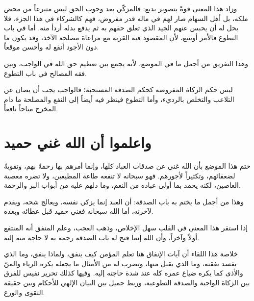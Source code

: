 وزاد  هذا المعنى قوةً بتصوير بديع: فالمزكّي بعد وجوب الحق ليس متبرعاً من محض ملكه، بل أهل السهام صار لهم في ماله قدر مفروض، فهم كالشركاء في هذا الجزء، فلا يحل له أن يحبس عنهم الجيد الذي تعلق حقهم به ثم يدفع بدله أردأ منه. أما في باب التطوع فالأمر أوسع، لأن المقصود فيه القربة مع مراعاة مصلحة الآخذ، وقد يكون ما دون الأجود أنفع له وأحسن موقعاً.

وهذا التفريق من أجمل ما في الموضع، لأنه يجمع بين تعظيم حق الله في الواجب، وبين فقه المصالح في باب التطوع.

\begin{fawaid}
ليس حكم الزكاة المفروضة كحكم الصدقة المستحبة؛ فالواجب يجب أن يصان عن التلاعب والتخلص بالرديء، وأما التطوع فينظر فيه أيضاً إلى النفع والمصلحة ما دام المخرج مباحاً نافعاً.
\end{fawaid}

\section{واعلموا أن الله غني حميد}
ختم  هذا الموضع بأن الله غني عن صدقات العباد كلها، وإنما أمرهم بها رحمةً بهم، وتقويةً لضعفائهم، وتكثيراً لأجورهم. فهو سبحانه لا تنفعه طاعة المطيعين، ولا تضره معصية العاصين، لكنه يحمد بما أولى عباده من النعم، وما دلهم عليه من أبواب البر والرحمة.

وهذا من أجمل ما يختم به باب الصدقة: أن العبد إنما يزكي نفسه، ويعالج شحه، ويقدم لآخرته، أما الله سبحانه فغني حميد قبل عطائه وبعده.

\begin{fawaid}
إذا استقر هذا المعنى في القلب سهل الإخلاص، وذهب العجب، وعلم المنفق أنه المنتفع أولاً وآخراً، وأن الله إنما فتح له باب الصدقة رحمة به لا حاجة منه إليه.
\end{fawaid}

\separator

خلاصة هذا اللقاء أن آيات الإنفاق هنا تعلم المؤمن كيف ينفق، ولماذا ينفق، وما الذي يفسد نفقته، وما الذي يقبل منها، وتضرب له من الأمثال ما يجعله يكره الرياء والمنّ والأذى كما يكره ضياع عمره كله عند شدة حاجته إليه. وفيها كذلك تحرير نفيس للفرق بين الزكاة الواجبة والصدقة التطوعية، وربط جميل بين البيان الإلهي للأحكام وبين حقيقة التقوى والورع.
